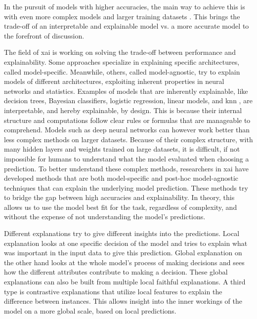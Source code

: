 In the pursuit of models with higher accuracies, the main way to achieve this is with even more complex models and larger training datasets \cite{bianchiniComplexityNeuralNetwork2014}. This brings the trade-off of an interpretable and explainable model vs. a more accurate model \cite{barredoarrietaExplainableArtificialIntelligence2020} to the forefront of discussion. 


The field of \gls{xai} is working on solving the trade-off between performance and explainability. Some approaches specialize in explaining specific architectures, called model-specific. Meanwhile, others, called model-agnostic, try to explain models of different architectures, exploiting inherent properties in neural networks and statistics. Examples of models that are inherently explainable, like decision trees, Bayesian classifiers, logistic regression, linear models, and \gls{knn} \cite{fixDiscriminatoryAnalysisNonparametric1989, coverNearestNeighborPattern1967}, are interpretable, and hereby explainable, by design. This is because their internal structure and computations follow clear rules or formulas that are manageable to comprehend.
Models such as deep neural networks can however work better than less complex methods on larger datasets. Because of their complex structure, with many hidden layers and weights trained on large datasets, it is difficult, if not impossible for humans to understand what the model evaluated when choosing a prediction. To better understand these complex methods, researchers in \gls{xai} have developed methods that are both model-specific and post-hoc model-agnostic techniques that can explain the underlying model prediction. These methods try to bridge the gap between high accuracies and explainability.
In theory, this allows us to use the model best fit for the task, regardless of complexity, and without the expense of not understanding the model's predictions. 

Different explanations try to give different insights into the predictions. Local explanation looks at one specific decision of the model and tries to explain what was important in the input data to give this prediction. Global explanation on the other hand looks at the whole model's process of making decisions and sees how the different attributes contribute to making a decision. These global explanations can also be built from multiple local faithful explanations. A third type is contrastive explanations that utilize local features to explain the difference between instances. This allows insight into the inner workings of the model on a more global scale, based on local predictions.

